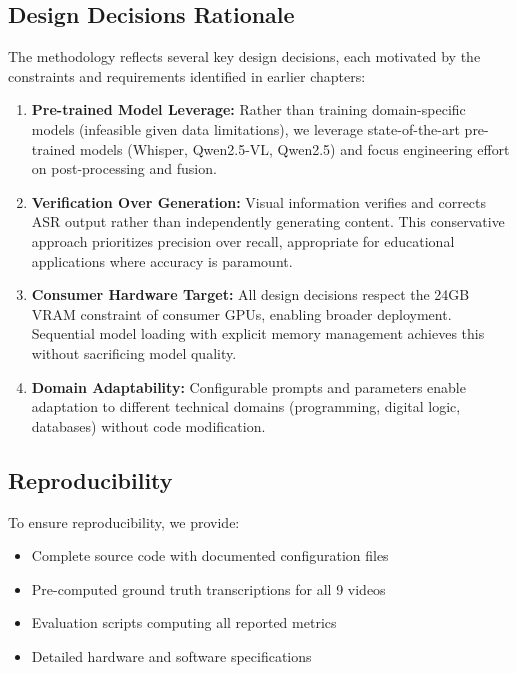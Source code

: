 \subsection{Design Decisions Rationale}

The methodology reflects several key design decisions, each motivated by the constraints and requirements identified in earlier chapters:

\begin{enumerate}
    \item \textbf{Pre-trained Model Leverage:} Rather than training domain-specific models (infeasible given data limitations), we leverage state-of-the-art pre-trained models (Whisper, Qwen2.5-VL, Qwen2.5) and focus engineering effort on post-processing and fusion.
    
    \item \textbf{Verification Over Generation:} Visual information verifies and corrects ASR output rather than independently generating content. This conservative approach prioritizes precision over recall, appropriate for educational applications where accuracy is paramount.
    
    \item \textbf{Consumer Hardware Target:} All design decisions respect the 24GB VRAM constraint of consumer GPUs, enabling broader deployment. Sequential model loading with explicit memory management achieves this without sacrificing model quality.
    
    \item \textbf{Domain Adaptability:} Configurable prompts and parameters enable adaptation to different technical domains (programming, digital logic, databases) without code modification.
\end{enumerate}

\subsection{Reproducibility}

To ensure reproducibility, we provide:

\begin{itemize}
    \item Complete source code with documented configuration files
    \item Pre-computed ground truth transcriptions for all 9 videos
    \item Evaluation scripts computing all reported metrics
    \item Detailed hardware and software specifications
\end{itemize}

